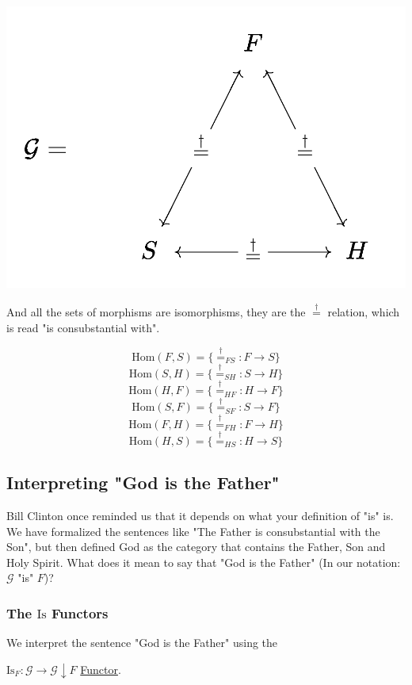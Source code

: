 \documentclass[11pt]{article}
\begin{document}
\begin{center}
\includegraphics[width=.9\linewidth]{./trinity.png}
\end{center}

And all the sets of morphisms are isomorphisms, they are the \(\stackrel{\dagger}{=}\) relation, which is read "is consubstantial with".

$$\text{Hom}(F,S) = \{ \stackrel{\dagger}{=}_{FS} : F \to S \} $$
$$\text{Hom}(S,H) = \{ \stackrel{\dagger}{=}_{SH} : S \to H \} $$
$$\text{Hom}(H,F) = \{ \stackrel{\dagger}{=}_{HF} : H \to F \} $$
$$\text{Hom}(S,F) = \{ \stackrel{\dagger}{=}_{SF} : S \to F \} $$
$$\text{Hom}(F,H) = \{ \stackrel{\dagger}{=}_{FH} : F \to H \} $$
$$\text{Hom}(H,S) = \{ \stackrel{\dagger}{=}_{HS} : H \to S \} $$
\subsection{Interpreting "God is the Father"}
\label{sec:orgfa8d053}
Bill Clinton once reminded us that it depends on what your definition of "is" is. We have formalized the sentences like "The Father is consubstantial with the Son", but then defined God as the category that contains the Father, Son and Holy Spirit. What does it mean to say that "God is the Father" (In our notation: \(\mathcal{G}\) "is" \(F\))?
\subsubsection{The \(\text{Is}\) Functors}
\label{sec:org4c89dc1}

We interpret the sentence "God is the Father" using the

\(\text{Is}_F : \mathcal{G} \to \mathcal{G}\downarrow F\) \hyperref[sec:org5f61f9d]{Functor}.
\end{document}
